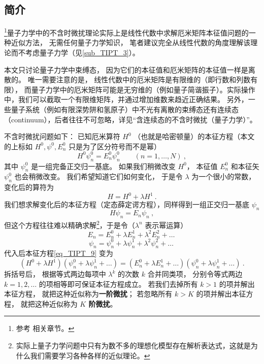 

\subsection{简介}
\footnote{参考 \cite{GriffQ} \cite{Shankar} \cite{Sakurai} \cite{Merzbacher} 相关章节。}量子力学中的不含时微扰理论实际上是线性代数中求解厄米矩阵本征值问题的一种近似方法， 无需任何量子力学知识， 笔者建议完全从线性代数的角度理解该理论而不考虑量子力学（见\autoref{sub_TIPT_3}）。

本文只讨论量子力学中束缚态， 因为它们的本征值和厄米矩阵的本征值一样是离散的。 唯一需要注意的是， 线性代数中的厄米矩阵是有限维的（即行数和列数有限）， 而量子力学中的厄米矩阵可能是无穷维的（例如量子简谐振子）。实际操作中，我们可以截取一个有限维矩阵，并通过增加维数来趋近正确结果。 另外，一些量子系统（例如有限深势阱和氢原子）中不光有离散的束缚态还有连续态（continuum），后者往往不可忽略，详见“含连续态的不含时微扰（量子力学）”。

不含时微扰问题如下： 已知厄米算符 $H^0$ （也就是哈密顿量）的本征方程（本文的上标如 $H^0, \psi^0, E_n^0$ 只是为了区分符号而不是幂）
\begin{equation}
H^0 \psi_n^0 = E_n^0 \psi_n^0 \qquad (n = 1,\dots, N)~,
\end{equation}
其中 $\psi_n^0$ 是一组完备正交归一基底。 如果我们稍微改变 $H^0$， 本征值 $E_n^0$ 和本征矢 $\psi_n^0$ 也会稍微改变。 我们希望知道它们如何变化， 于是令 $\lambda$ 为一个很小的常数， 变化后的算符为
\begin{equation}\label{eq_TIPT_3}
H = H^0 + \lambda H^1~.
\end{equation}
我们想求解变化后的本征方程（定态薛定谔方程），同样得到一组正交归一基底 $\psi_n$
\begin{equation}\label{eq_TIPT_9}
H \psi_n = E_n \psi_n~,
\end{equation}
但这个方程往往难以精确求解\footnote{实际上量子力学问题中只有为数不多的理想化模型存在解析表达式，这就是为什么我们需要学习各种各样的近似理论。}，于是令（$\lambda^n$ 表示幂运算）
\begin{equation}\label{eq_TIPT_11}
E_n = E_n^0 + \lambda E_n^1 + \lambda^2 E_n^2 + \dots~
\end{equation}
\begin{equation}\label{eq_TIPT_12}
\psi_n = \psi_n^0 + \lambda\psi_n^1 + \lambda^2 \psi_n^2 + \dots~
\end{equation}
代入后本征方程\autoref{eq_TIPT_9} 变为
\begin{equation}\label{eq_TIPT_10}
(H^0 + \lambda H^1)(\psi_n^0 + \lambda\psi_n^1 + \dots) = (E_n^0 + \lambda E_n^1 + \dots)(\psi_n^0 + \lambda\psi_n^1 + \dots)~.
\end{equation}
拆括号后， 根据等式两边每项中 $\lambda^k$ 的次数 $k$ 合并同类项， 分别令等式两边 $k=1,2,\dots$ 的项相等即可保证本征方程成立。 若我们去掉所有 $k > 1$ 的项并解出本征方程， 就把这种近似称为\textbf{一阶微扰}； 若忽略所有 $k > K$ 的项并解出本征方程， 就把这种近似称为 \textbf{$K$ 阶微扰}。

